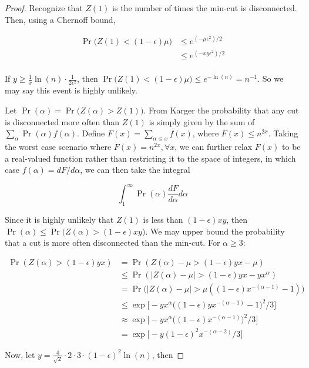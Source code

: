 \documentclass{article}
\begin{document}
\begin{proof}
Recognize that $Z(1)$ is the number of times the min-cut is disconnected. Then, using a Chernoff bound, 

\begin{align*}
\Pr \bigg(Z(1) < (1-\epsilon) \mu \bigg) &\leq e^{(-\mu \epsilon^2)/2} \\
&\leq e^{(-xy \epsilon^2)/2} \\
\end{align*}

If $y \geq \frac{1}{x} \ln(n) \cdot \frac{1}{2\epsilon^2}$, then $\Pr \bigg(Z(1) < (1-\epsilon)\mu \bigg) \leq e^{-\ln(n)} = n^{-1}$. So we may say this event is highly unlikely. 

Let $\Pr(\alpha) = \Pr \bigg( Z(\alpha) > Z(1) \bigg)$. From Karger\cite{Karger} the probability that any cut is disconnected more often than $Z(1)$ is simply given by the sum of $\sum_{\alpha} \Pr(\alpha) f(\alpha)$. Define $F(x) = \sum_{\alpha \leq x} f(x)$, where $F(x) \leq n^{2x}$. Taking the worst case scenario where $F(x) = n^{2x}, \forall x$, we can further relax $F(x)$ to be a real-valued function rather than restricting it to the space of integers, in which case $f(\alpha) = dF/d\alpha$, we can then take the integral

\[
\int_{1}^\infty \Pr(\alpha) \frac{dF}{d\alpha} d\alpha
\]

Since it is highly unlikely that $Z(1)$ is less than $(1-\epsilon)xy$, then $\Pr(\alpha) \leq \Pr \bigg(Z(\alpha) > (1-\epsilon)xy \bigg)$. We may upper bound the probability that a cut is more often disconnected than the min-cut. For $\alpha \geq 3$:

\begin{align*}
\Pr(Z(\alpha) > (1 - \epsilon)yx) &= \Pr(Z(\alpha) - \mu > (1 - \epsilon)yx - \mu) \\
&\leq \Pr(|Z(\alpha)-\mu| > (1-\epsilon)yx - yx^\alpha) \\
&= \Pr \bigg(|Z(\alpha)-\mu| > \mu ((1-\epsilon) x^{-(\alpha-1)}-1)\bigg) \\
&\leq \exp \bigg[-yx^\alpha \bigg((1-\epsilon)yx^{-(\alpha-1)}-1\bigg)^2/3\bigg] \\
&\approx \exp \bigg[-yx^\alpha \bigg((1-\epsilon)x^{-(\alpha - 1)}\bigg)^2/3\bigg] \\
&= \exp \bigg[-y (1-\epsilon)^2 x^{-(\alpha-2)}/3\bigg]
\end{align*}

Now, let $y = \frac{4}{\sqrt{2}} \cdot 2 \cdot 3 \cdot (1-\epsilon)^2 \ln{(n)}$, then


\end{proof}
\end{document}
